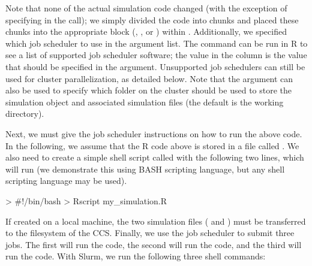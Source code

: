 
Note that none of the actual simulation code changed (with the exception of specifying  in the  call); we simply divided the code into chunks and placed these chunks into the appropriate block (, , or ) within . Additionally, we specified which job scheduler to use in the  argument list. The command  can be run in R to see a list of supported job scheduler software; the value in the  column is the value that should be specified in the  argument. Unsupported job schedulers can still be used for cluster parallelization, as detailed below. Note that the  argument can also be used to specify which folder on the cluster should be used to store the simulation object and associated simulation files (the default is the working directory).

Next, we must give the job scheduler instructions on how to run the above code. In the following, we assume that the R code above is stored in a file called . We also need to create a simple shell script called  with the following two lines, which will run  (we demonstrate this using BASH scripting language, but any shell scripting language may be used).

\begin{example}
> #!/bin/bash
> Rscript my_simulation.R
\end{example}

If created on a local machine, the two simulation files ( and ) must be transferred to the filesystem of the CCS. Finally, we use the job scheduler to submit three jobs. The first will run the  code, the second will run the  code, and the third will run the  code. With Slurm, we run the following three shell commands:

